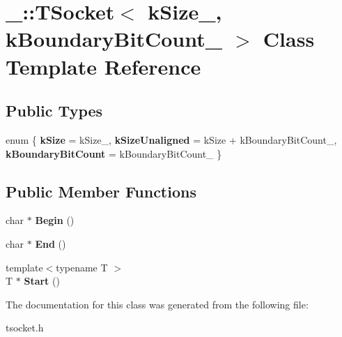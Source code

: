 \hypertarget{class___1_1_t_socket}{}\section{\+\_\+\+:\+:T\+Socket$<$ k\+Size\+\_\+, k\+Boundary\+Bit\+Count\+\_\+ $>$ Class Template Reference}
\label{class___1_1_t_socket}
\subsection*{Public Types}
\begin{DoxyCompactItemize}
\item 
\mbox{\label{class___1_1_t_socket_afff9c7fae8a8b0806846b352db264d02}} 
enum \{ {\bfseries k\+Size} = k\+Size\+\_\+, 
{\bfseries k\+Size\+Unaligned} = k\+Size + k\+Boundary\+Bit\+Count\+\_\+, 
{\bfseries k\+Boundary\+Bit\+Count} = k\+Boundary\+Bit\+Count\+\_\+
 \}
\end{DoxyCompactItemize}
\subsection*{Public Member Functions}
\begin{DoxyCompactItemize}
\item 
\mbox{\label{class___1_1_t_socket_a1ab41cb60896e42b7449f630a3cef13a}} 
char $\ast$ {\bfseries Begin} ()
\item 
\mbox{\label{class___1_1_t_socket_a90699751c579439af0b64d98186339c7}} 
char $\ast$ {\bfseries End} ()
\item 
\mbox{\label{class___1_1_t_socket_aa08a16617d9ae4a0c4c8b15d26e1f0c6}} 
{\footnotesize template$<$typename T $>$ }\\T $\ast$ {\bfseries Start} ()
\end{DoxyCompactItemize}


The documentation for this class was generated from the following file\+:\begin{DoxyCompactItemize}
\item 
tsocket.\+h\end{DoxyCompactItemize}

